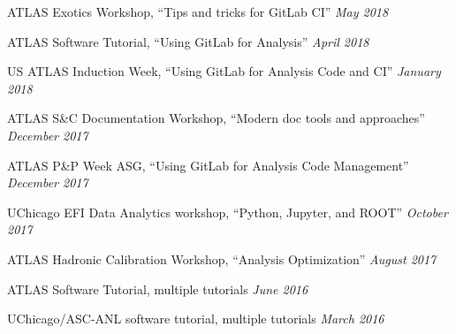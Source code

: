 \documentclass[margin,line]{resume}
\begin{document}
\begin{resume}
\begin{list2}
  \item ATLAS Exotics Workshop, ``Tips and tricks for GitLab CI'' \hfill \textsl{May 2018}
  \item ATLAS Software Tutorial, ``Using GitLab for Analysis'' \hfill \textsl{April 2018}
  \item US ATLAS Induction Week, ``Using GitLab for Analysis Code and CI'' \hfill \textsl{January 2018}
  \item ATLAS S\&C Documentation Workshop, ``Modern doc tools and approaches'' \hfill \textsl{December 2017}
  \item ATLAS P\&P Week ASG, ``Using GitLab for Analysis Code Management'' \hfill \textsl{December 2017}
  \item UChicago EFI Data Analytics workshop, ``Python, Jupyter, and ROOT'' \hfill \textsl{October 2017}
  \item ATLAS Hadronic Calibration Workshop, ``Analysis Optimization'' \hfill \textsl{August 2017}
  \item ATLAS Software Tutorial, multiple tutorials \hfill \textsl{June 2016}
  \item UChicago/ASC-ANL software tutorial, multiple tutorials \hfill \textsl{March 2016}
\end{list2}


\end{resume}
\end{document}
